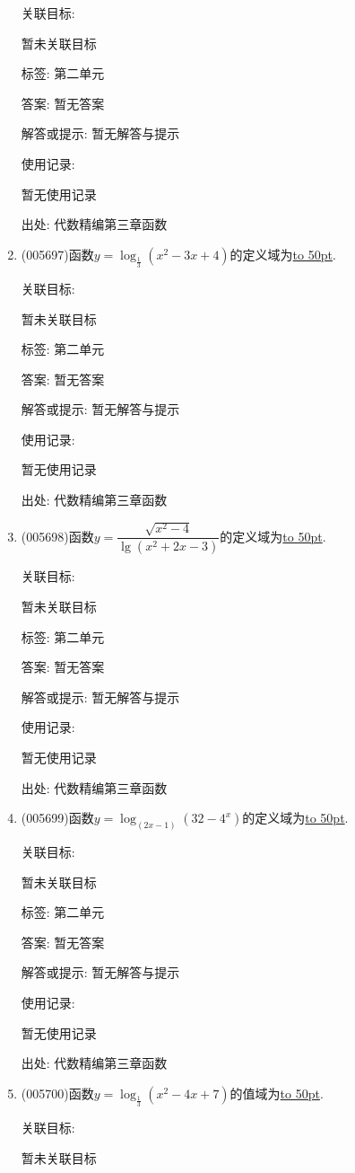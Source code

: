 \documentclass[10pt,a4paper]{article}
\newcommand{\blank}[1]{\underline{\hbox to #1pt{}}}
\begin{document}
\begin{enumerate}[1.]
关联目标:

暂未关联目标



标签: 第二单元

答案: 暂无答案

解答或提示: 暂无解答与提示

使用记录:

暂无使用记录


出处: 代数精编第三章函数
\item { (005697)}函数$y=\log_{\frac 13}(x^2-3x+4)$的定义域为\blank{50}.


关联目标:

暂未关联目标



标签: 第二单元

答案: 暂无答案

解答或提示: 暂无解答与提示

使用记录:

暂无使用记录


出处: 代数精编第三章函数
\item { (005698)}函数$y=\dfrac{\sqrt {x^2-4}}{\lg (x^2+2x-3)}$的定义域为\blank{50}.


关联目标:

暂未关联目标



标签: 第二单元

答案: 暂无答案

解答或提示: 暂无解答与提示

使用记录:

暂无使用记录


出处: 代数精编第三章函数
\item { (005699)}函数$y=\log_{(2x-1)}(32-4^x)$的定义域为\blank{50}.


关联目标:

暂未关联目标



标签: 第二单元

答案: 暂无答案

解答或提示: 暂无解答与提示

使用记录:

暂无使用记录


出处: 代数精编第三章函数
\item { (005700)}函数$y=\log_{\frac 13}(x^2-4x+7)$的值域为\blank{50}.


关联目标:

暂未关联目标




\end{enumerate}
\end{document}
